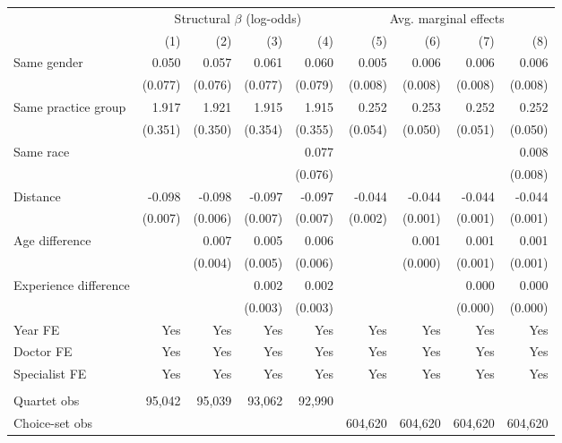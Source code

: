 
\begin{tabular}{lrrrrrrrr}
\toprule
\multicolumn{1}{c}{ } & \multicolumn{4}{c}{Structural $\beta$ (log-odds)} & \multicolumn{4}{c}{Avg. marginal effects} \\
\cmidrule(l{3pt}r{3pt}){2-5} \cmidrule(l{3pt}r{3pt}){6-9}
 & (1) & (2) & (3) & (4) & (5) & (6) & (7) & (8)\\
\midrule
Same gender & 0.050 & 0.057 & 0.061 & 0.060 & 0.005 & 0.006 & 0.006 & 0.006\\
 & (0.077) & (0.076) & (0.077) & (0.079) & (0.008) & (0.008) & (0.008) & (0.008)\\
Same practice group & 1.917 & 1.921 & 1.915 & 1.915 & 0.252 & 0.253 & 0.252 & 0.252\\
 & (0.351) & (0.350) & (0.354) & (0.355) & (0.054) & (0.050) & (0.051) & (0.050)\\
Same race &  &  &  & 0.077 &  &  &  & 0.008\\
 &  &  &  & (0.076) &  &  &  & (0.008)\\
Distance & -0.098 & -0.098 & -0.097 & -0.097 & -0.044 & -0.044 & -0.044 & -0.044\\
 & (0.007) & (0.006) & (0.007) & (0.007) & (0.002) & (0.001) & (0.001) & (0.001)\\
Age difference &  & 0.007 & 0.005 & 0.006 &  & 0.001 & 0.001 & 0.001\\
 &  & (0.004) & (0.005) & (0.006) &  & (0.000) & (0.001) & (0.001)\\
Experience difference &  &  & 0.002 & 0.002 &  &  & 0.000 & 0.000\\
 &  &  & (0.003) & (0.003) &  &  & (0.000) & (0.000)\\
\midrule
Year FE & Yes & Yes & Yes & Yes & Yes & Yes & Yes & Yes\\
Doctor FE & Yes & Yes & Yes & Yes & Yes & Yes & Yes & Yes\\
Specialist FE & Yes & Yes & Yes & Yes & Yes & Yes & Yes & Yes\\
\midrule\\
Quartet obs & 95,042 & 95,039 & 93,062 & 92,990 &  &  &  & \\
Choice-set obs &  &  &  &  & 604,620 & 604,620 & 604,620 & 604,620\\
\bottomrule
\end{tabular}
